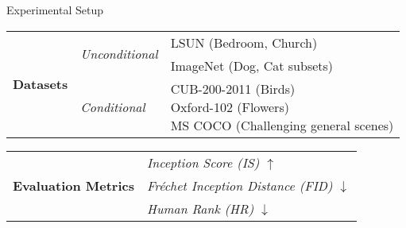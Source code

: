 \documentclass{beamer}
\begin{document}
\begin{frame}{Experimental Setup}
    \centering
    \begin{tabular}{|p{}|p{}|p{}|}
        \hline
        \multirow{6}{0.15\textwidth}{\textbf{Datasets}} & \multirow{2}{0.2\textwidth}{\textit{Unconditional}} & LSUN (Bedroom, Church) \\
                                                        &                                                     & ImageNet (Dog, Cat subsets) \\\cline{2-3}
                                                        & \multirow{4}{0.2\textwidth}{\textit{Conditional}}   & \multirow{4}{0.55\textwidth}{CUB-200-2011 (Birds) \newline Oxford-102 (Flowers) \newline MS COCO (Challenging general scenes)} \\
                                                        &                                                     & \\
                                                        &                                                     & \\
                                                        &                                                     & \\
        \hline
    \end{tabular}
    \vspace{1em}

    \centering
    \begin{tabular}{|p{}|p{}|}
        \hline
        \multirow{3}{0.15\textwidth}{\textbf{Evaluation Metrics}} & \textit{Inception Score (IS)}             $\uparrow$ \\\cline{2-2}
                                                                  & \textit{Fréchet Inception Distance (FID)} $\downarrow$ \\\cline{2-2}
                                                                  & \textit{Human Rank (HR)}                  $\downarrow$ \\
        \hline
    \end{tabular}
    \vspace{1em}


\end{frame}
\end{document}
